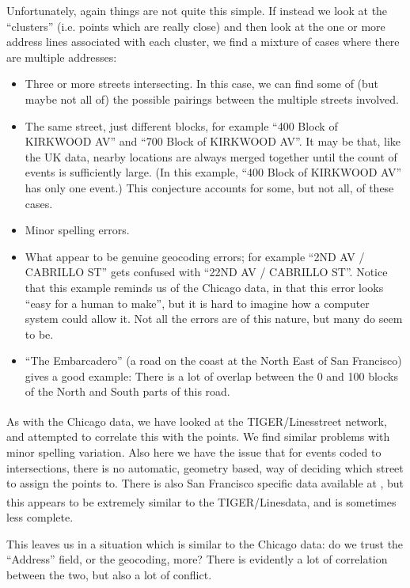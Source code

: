 \documentclass[twoside,a4paper,twocolumn,10pt]{article}
\theoremstyle{plain}
\theoremstyle{definition}
\newcommand{\regsym}{\textsuperscript{\textregistered}}
\begin{document}
Unfortunately, again things are not quite this simple.  If instead we look at the ``clusters''
(i.e. points which are really close) and then look at the one or more address lines associated
with each cluster, we find a mixture of cases where there are multiple addresses:
\begin{itemize}
\item Three or more streets intersecting.  In this case, we can find some of (but maybe not all
  of) the possible pairings between the multiple streets involved.
\item The same street, just different blocks, for example ``400 Block of KIRKWOOD AV'' and
  ``700 Block of KIRKWOOD AV''.  It may be that, like the UK data, nearby locations are always
  merged together until the count of events is sufficiently large.  (In this example,
  ``400 Block of KIRKWOOD AV'' has only one event.)  This conjecture accounts for some, but
  not all, of these cases.
\item Minor spelling errors.
\item What appear to be genuine geocoding errors; for example ``2ND AV / CABRILLO ST''
  gets confused with ``22ND AV / CABRILLO ST''.  Notice that this example reminds us of the
  Chicago data, in that this error looks ``easy for a human to make'', but it is hard to
  imagine how a computer system could allow it.  Not all the errors are of this nature,
  but many do seem to be.
\item ``The Embarcadero'' (a road on the coast at the North East of San Francisco)
  gives a good example: There is a lot of overlap between the 0 and 100 blocks of the North
  and South parts of this road.
\end{itemize}

As with the Chicago data, we have looked at the TIGER/Lines\regsym street network, and
attempted to correlate this with the points.  We find similar problems with minor spelling
variation.  Also here we have the issue that for events coded to intersections, there is
no automatic, geometry based, way of deciding which street to assign the points to.
There is also San Francisco specific data available at \cite{sfgeo}, but this appears to
be extremely similar to the TIGER/Lines\regsym data, and is sometimes less complete.

This leaves us in a situation which is similar to the Chicago data: do we trust the
``Address'' field, or the geocoding, more?  There is evidently a lot of correlation between
the two, but also a lot of conflict.
\end{document}
